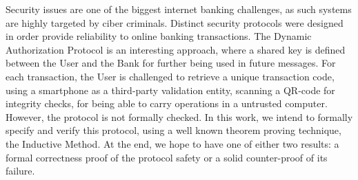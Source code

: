 Security issues are one of the biggest internet banking challenges, as such systems are highly targeted by ciber criminals. Distinct security protocols were designed in order provide reliability to online banking transactions. The Dynamic Authorization Protocol is an interesting approach, where a shared key is defined between the User and the Bank for further being used in future messages. For each transaction, the User is challenged to retrieve a unique transaction code, using a smartphone as a third-party validation entity, scanning a QR-code for integrity checks, for being able to carry operations in a untrusted computer. However, the protocol is not formally checked. In this work, we intend to formally specify and verify this protocol, using a well known theorem proving technique, the Inductive Method. At the end, we hope to have one of either two results: a formal correctness proof of the protocol safety or a solid counter-proof of its failure.
